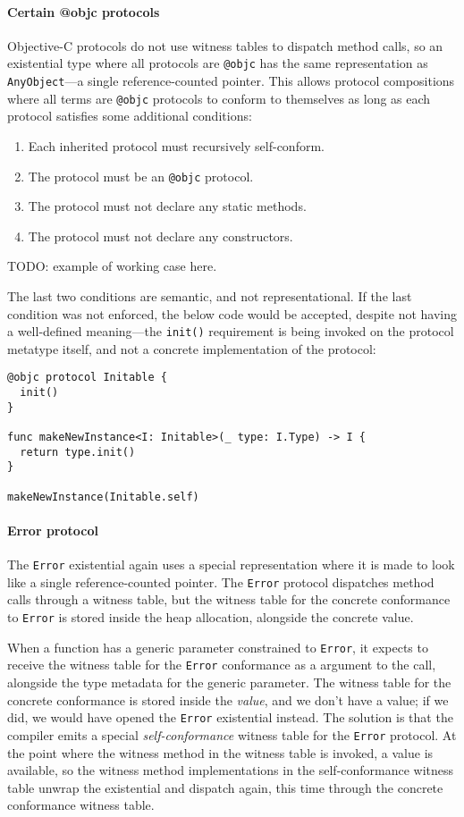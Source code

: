 \documentclass[../generics]{subfiles}
\begin{document}
\paragraph{Certain @objc protocols} Objective-C protocols do not use witness tables to dispatch method calls, so an existential type where all protocols are \texttt{@objc} has the same representation as \texttt{AnyObject}---a single reference-counted pointer. This allows protocol compositions where all terms are \texttt{@objc} protocols to conform to themselves as long as each protocol satisfies some additional conditions:
\begin{enumerate}
\item Each inherited protocol must recursively self-conform.
\item The protocol must be an \texttt{@objc} protocol.
\item The protocol must not declare any static methods.
\item The protocol must not declare any constructors.
\end{enumerate}

TODO: example of working case here.

The last two conditions are semantic, and not representational. If the last condition was not enforced, the below code would be accepted, despite not having a well-defined meaning---the \texttt{init()} requirement is being invoked on the protocol metatype itself, and not a concrete implementation of the protocol:
\begin{Verbatim}
@objc protocol Initable {
  init()
}

func makeNewInstance<I: Initable>(_ type: I.Type) -> I {
  return type.init()
}

makeNewInstance(Initable.self)
\end{Verbatim}

\paragraph{Error protocol} The \texttt{Error} existential again uses a special representation where it is made to look like a single reference-counted pointer. The \texttt{Error} protocol dispatches method calls through a witness table, but the witness table for the concrete conformance to \texttt{Error} is stored inside the heap allocation, alongside the concrete value. 

When a function has a generic parameter constrained to \texttt{Error}, it expects to receive the witness table for the \texttt{Error} conformance as a argument to the call, alongside the type metadata for the generic parameter. The witness table for the concrete conformance is stored inside the \emph{value}, and we don't have a value; if we did, we would have opened the \texttt{Error} existential instead. The solution is that the compiler emits a special \emph{self-conformance} witness table for the \texttt{Error} protocol. At the point where the witness method in the witness table is invoked, a value is available, so the witness method implementations in the self-conformance witness table unwrap the existential and dispatch again, this time through the concrete conformance witness table.
\end{document}
